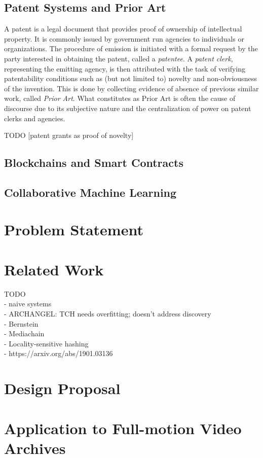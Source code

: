 \documentclass[conference]{IEEEtran}
\begin{document}
\subsection{Patent Systems and Prior Art}
A patent is a legal document that provides proof of ownership of intellectual property. It is commonly issued by government run agencies to individuals or organizations. The procedure of emission is initiated with a formal request by the party interested in obtaining the patent, called a \emph{patentee}. A \emph{patent clerk}, representing the emitting agency, is then attributed with the task of verifying patentability conditions such as (but not limited to) novelty and non-obviousness of the invention. This is done by collecting evidence of absence of previous similar work, called \emph{Prior Art}. What constitutes as Prior Art is often the cause of discourse due to its subjective nature and the centralization of power on patent clerks and agencies.

TODO [patent grants as proof of novelty]

\subsection{Blockchains and Smart Contracts}
\subsection{Collaborative Machine Learning}
\section{Problem Statement}
\section{Related Work}
TODO \\
- naive systems\\
- ARCHANGEL: TCH needs overfitting; doesn't address discovery\\
- Bernstein\\
- Mediachain\\
- Locality-sensitive hashing\\
- https://arxiv.org/abs/1901.03136\\
\section{Design Proposal}
\section{Application to Full-motion Video Archives}
\end{document}
